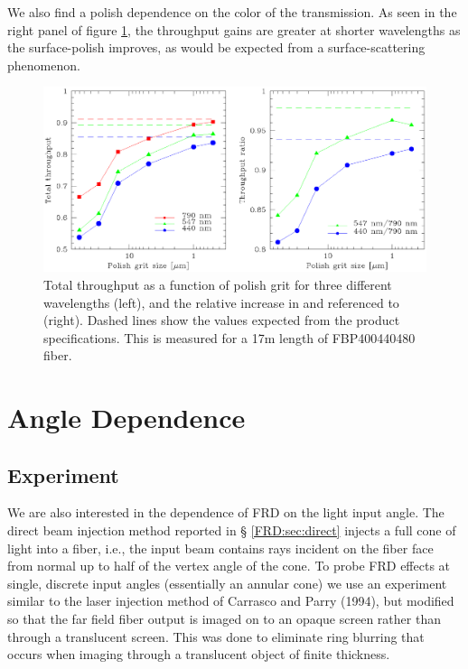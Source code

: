 We also find a polish dependence on the color of the transmission.  As
seen in the right panel of figure \ref{fig:tputwave}, the throughput
gains are greater at shorter wavelengths as the surface-polish
improves, as would be expected from a surface-scattering phenomenon.

\begin{figure}[ht]
  \centering
  \includegraphics[width=\textwidth, trim=0 4in 0 0, clip=true]{FRD/figs/tput.eps}
  \caption[Total throughput as a function of wavelength and polish
    level]{\fixspacing\label{fig:tputwave} Total throughput as a function of
    polish grit for three different wavelengths (left), and the relative
    increase in \filtB and \filty referenced to \filtI (right). Dashed lines
    show the values expected from the product specifications. This is measured
    for a 17m length of FBP400440480 fiber.}
\end{figure}

\section{Angle Dependence}
\label{FRD:sec:angle}
\subsection{Experiment}
We are also interested in the dependence of FRD on the light input
angle. The direct beam injection method reported in \S
\ref{FRD:sec:direct} injects a full cone of light into a fiber, i.e., 
the input beam contains rays incident on the fiber face from normal up
to half of the vertex angle of the cone.  To probe FRD effects at
single, discrete input angles (essentially an annular cone) we use an
experiment similar to the laser injection method of Carrasco and
Parry (1994)\cite{Carrasco, Haynes11}, but modified so that the far
field fiber output is imaged on to an opaque screen rather than through a
translucent screen. This was done to eliminate ring blurring that
occurs when imaging through a translucent object of finite thickness.

